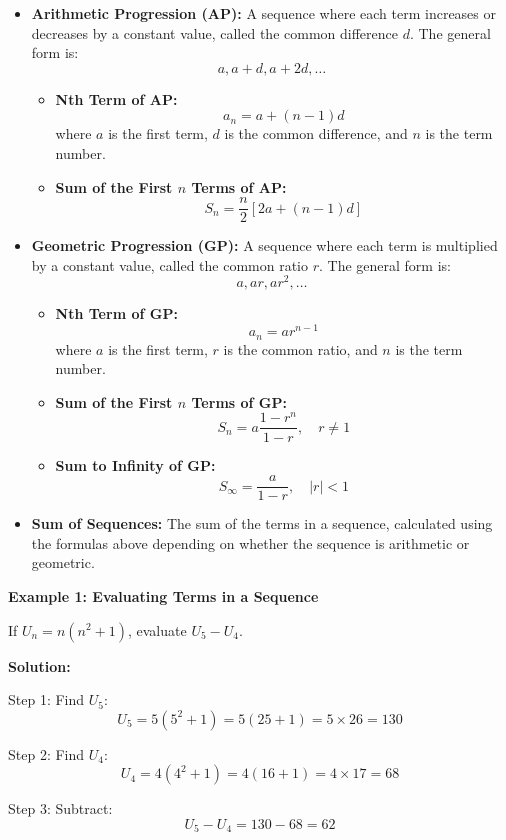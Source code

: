 \begin{itemize}
    \item \textbf{Arithmetic Progression (AP):} A sequence where each term increases or decreases by a constant value, called the common difference $d$. The general form is:
    \[
    a, a+d, a+2d, \dots
    \]
        \begin{itemize}
            \item \textbf{Nth Term of AP:}
            \[
            a_n = a + (n-1)d
            \]
            where $a$ is the first term, $d$ is the common difference, and $n$ is the term number.
            \item \textbf{Sum of the First $n$ Terms of AP:}
            \[
            S_n = \frac{n}{2} [2a + (n-1)d]
            \]
        \end{itemize}
    \item \textbf{Geometric Progression (GP):} A sequence where each term is multiplied by a constant value, called the common ratio $r$. The general form is:
    \[
    a, ar, ar^2, \dots
    \]
        \begin{itemize}
            \item \textbf{Nth Term of GP:}
            \[
            a_n = ar^{n-1}
            \]
            where $a$ is the first term, $r$ is the common ratio, and $n$ is the term number.
            \item \textbf{Sum of the First $n$ Terms of GP:}
            \[
            S_n = a \frac{1-r^n}{1-r}, \quad r \neq 1
            \]
            \item \textbf{Sum to Infinity of GP:}
            \[
            S_\infty = \frac{a}{1-r}, \quad |r| < 1
            \]
        \end{itemize}
    \item \textbf{Sum of Sequences:} The sum of the terms in a sequence, calculated using the formulas above depending on whether the sequence is arithmetic or geometric.
\end{itemize}

\begin{flushleft}
\textbf{Example 1: Evaluating Terms in a Sequence}

If \( U_n = n(n^2 + 1) \), evaluate \( U_5 - U_4 \).

\textbf{Solution:} \vspace{0.2cm}

Step 1: Find \( U_5 \):
\[
U_5 = 5(5^2 + 1) = 5(25 + 1) = 5 \times 26 = 130
\]

Step 2: Find \( U_4 \):
\[
U_4 = 4(4^2 + 1) = 4(16 + 1) = 4 \times 17 = 68
\]

Step 3: Subtract:
\[
U_5 - U_4 = 130 - 68 = \boxed{62}
\]
\end{flushleft}



